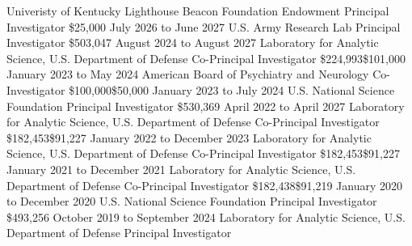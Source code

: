 \documentclass{cv}
\begin{document}
	{Univeristy of Kentucky Lighthouse Beacon Foundation Endowment}
	{Principal Investigator}
	{\$25,000}{}
	{July 2026 to June 2027}
	{U.S. Army Research Lab}
	{Principal Investigator}
	{\$503,047}{}
	{August 2024 to August 2027}
	{Laboratory for Analytic Science, U.S. Department of Defense}
	{Co-Principal Investigator}
	{\$224,993}{\$101,000}
	{January 2023 to May 2024}
	{American Board of Psychiatry and Neurology}
	{Co-Investigator}
	{\$100,000}{\$50,000}
	{January 2023 to July 2024}
	{U.S. National Science Foundation}
	{Principal Investigator}
	{\$530,369}{}
	{April 2022 to April 2027}
	{Laboratory for Analytic Science, U.S. Department of Defense}
	{Co-Principal Investigator}
	{\$182,453}{\$91,227}
	{January 2022 to December 2023}
	{Laboratory for Analytic Science, U.S. Department of Defense}
	{Co-Principal Investigator}
	{\$182,453}{\$91,227}
	{January 2021 to December 2021}
	{Laboratory for Analytic Science, U.S. Department of Defense}
	{Co-Principal Investigator}
	{\$182,438}{\$91,219}
	{January 2020 to December 2020}
	{U.S. National Science Foundation}
	{Principal Investigator}
	{\$493,256}{}
	{October 2019 to September 2024}
	{Laboratory for Analytic Science, U.S. Department of Defense}
	{Principal Investigator}
\end{document}
